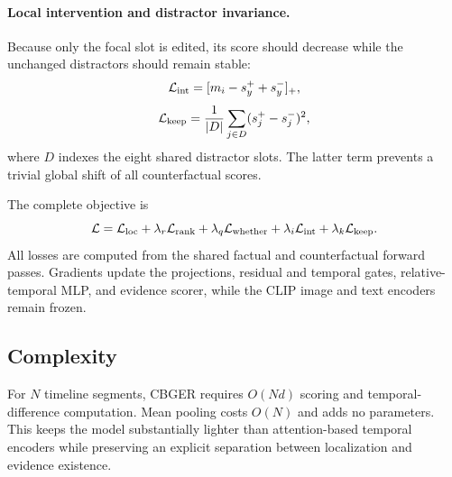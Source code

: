 \paragraph{Local intervention and distractor invariance.}
Because only the focal slot is edited, its score should decrease while the unchanged distractors should remain stable:
\begin{equation}
\mathcal L_{\rm int}=[m_i-s_y^+ + s_y^-]_+,
\label{eq:int-loss}
\end{equation}
\begin{equation}
\mathcal L_{\rm keep}
=\frac{1}{|D|}\sum_{j\in D}(s_j^+-s_j^-)^2,
\end{equation}
where $D$ indexes the eight shared distractor slots. The latter term prevents a trivial global shift of all counterfactual scores.

The complete objective is
\begin{equation}
\mathcal L
=\mathcal L_{\rm loc}
+\lambda_r\mathcal L_{\rm rank}
+\lambda_q\mathcal L_{\rm whether}
+\lambda_i\mathcal L_{\rm int}
+\lambda_k\mathcal L_{\rm keep}.
\label{eq:total-loss}
\end{equation}
All losses are computed from the shared factual and counterfactual forward passes. Gradients update the projections, residual and temporal gates, relative-temporal MLP, and evidence scorer, while the CLIP image and text encoders remain frozen.

\subsection{Complexity}

For $N$ timeline segments, CBGER requires $O(Nd)$ scoring and temporal-difference computation. Mean pooling costs $O(N)$ and adds no parameters. This keeps the model substantially lighter than attention-based temporal encoders while preserving an explicit separation between localization and evidence existence.

